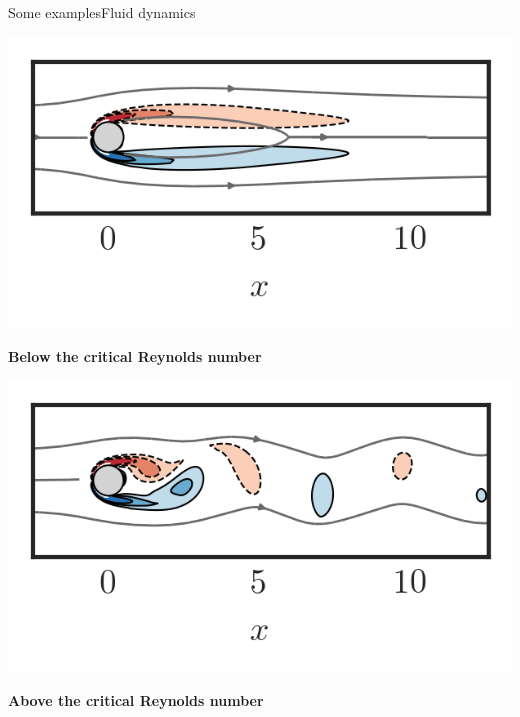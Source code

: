 \documentclass[usenames,dvipsnames,svgnames,10pt,aspectratio=169]{beamer}
\begin{document}
\begin{frame}[t, c]{Some examples}{Fluid dynamics}
  \begin{minipage}{.48\textwidth}
    \centering
    \includegraphics[width=\textwidth]{base_flow}

    \textbf{Below the critical Reynolds number}
  \end{minipage}%
  \hfill
  \begin{minipage}{.48\textwidth}
    \centering
    \includegraphics[width=\textwidth]{ground_truth_flow_field}

    \textbf{Above the critical Reynolds number}
  \end{minipage}

  \vspace{1cm}
\end{frame}
\end{document}
